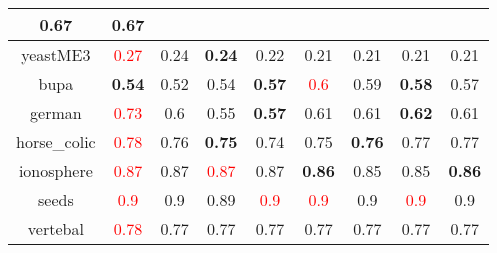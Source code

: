\documentclass{article}%
\begin{document}
\begin{tabular}{c|cccccccc}
{0.67
}&0.67\\%
\hline%
yeastME3&\textcolor{red}{ 
0.27
}&0.24&\textbf{0.24}&0.22&0.21&0.21&0.21&0.21\\%
\hline%
bupa&\textbf{0.54}&0.52&0.54&\textbf{0.57}&\textcolor{red}{ 
0.6
}&0.59&\textbf{0.58}&0.57\\%
\hline%
german&\textcolor{red}{ 
0.73
}&0.6&0.55&\textbf{0.57}&0.61&0.61&\textbf{0.62}&0.61\\%
\hline%
horse\_colic&\textcolor{red}{ 
0.78
}&0.76&\textbf{0.75}&0.74&0.75&\textbf{0.76}&0.77&0.77\\%
\hline%
ionosphere&\textcolor{red}{ 
0.87
}&0.87&\textcolor{red}{ 
0.87
}&0.87&\textbf{0.86}&0.85&0.85&\textbf{0.86}\\%
\hline%
seeds&\textcolor{red}{ 
0.9
}&0.9&0.89&\textcolor{red}{ 
0.9
}&\textcolor{red}{ 
0.9
}&0.9&\textcolor{red}{ 
0.9
}&0.9\\%
\hline%
vertebal&\textcolor{red}{ 
0.78
}&0.77&0.77&0.77&0.77&0.77&0.77&0.77\\%
\hline%
\end{tabular}

%
\end{document}
